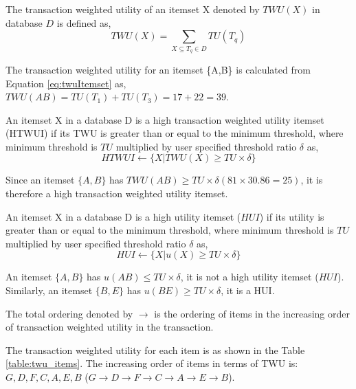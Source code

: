 \documentclass[11pt,openright]{report}
\begin{document}
\begin{definition}
	The transaction weighted utility of an itemset X denoted by $TWU(X)$ in database $D$ is defined as,
	\begin{equation}
	TWU(X) = \sum_{X \subseteq T_q \in D} TU(T_q) \label{eq:twuItemset}
	\end{equation}
\end{definition}
 The transaction weighted utility for an itemset \{A,B\} is calculated from Equation \ref{eq:twuItemset} as,\\
 \indent$TWU(AB) = TU(T_1) + TU(T_3) = 17 + 22 = 39$.

\begin{definition}
	An itemset X in a database D is a high transaction weighted utility itemset (HTWUI) if its TWU is greater than or equal to the minimum threshold, where minimum threshold is $TU$ multiplied by user specified threshold ratio $\delta$ as,
	\begin{equation}
	HTWUI \gets \{X|TWU(X) \ge TU \times \delta \} \label{eq:htwui}
	\end{equation}
\end{definition}
Since an itemset $\{A,B\}$ has $TWU(AB) \ge TU \times \delta (81 \times 30.86 = 25)$, it is therefore a high transaction weighted utility itemset. 


\begin{definition}
	An itemset X in a database D is a high utility itemset ($HUI$) if its utility is greater than or equal to the minimum threshold, where minimum threshold is $TU$ multiplied by user specified threshold ratio $\delta$ as,
	\begin{equation}
	HUI \gets \{X|u(X) \ge TU \times \delta \} \label{eq:hui}
	\end{equation}
\end{definition}
An itemset $\{A,B\}$ has $u(AB) \le TU \times \delta$, it is not a high utility itemset ($HUI$). Similarly, an itemset $\{B,E\}$ has $u(BE) \ge TU \times \delta$, it is a HUI.

\begin{definition}
	\label{def:total_ordering}
	The total ordering denoted by $\rightarrow$ is the ordering of items in the increasing order of transaction weighted utility in the transaction. 	
\end{definition}
The transaction weighted utility for each item is as shown in the Table \ref{table:twu_items}. The increasing order of items in terms of TWU is: $G, D, F, C, A, E, B$ ($G \rightarrow D \rightarrow F \rightarrow C \rightarrow A \rightarrow E \rightarrow B$).
\end{document}
